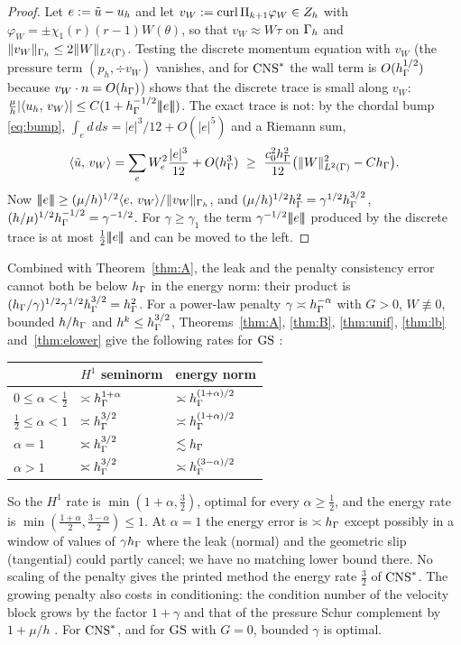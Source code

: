 \begin{proof}
Let $e:=\tilde u-u_h$ and let $v_W:=\operatorname{curl}\Pi_{k+1}\varphi_W\in Z_h$ with $\varphi_W=\pm\chi_1(r)(r-1)W(\theta)$, so that $v_W\approx W\tau$ on $\Gamma_h$ and $\lVert v_W\rVert_{\Gamma_h}\le2\lVert W\rVert_{L^2(\Gamma)}$. Testing the discrete momentum equation with $v_W$ (the pressure term $(p_h,\div v_W)$ vanishes, and for $\mathrm{CNS}^\ast$ the wall term is $O(h_\Gamma^{1/2})$ because $v_W\cdot n=O(h_\Gamma)$) shows that the discrete trace is small along $v_W$: $\frac\mu h|\langle u_h,\, v_W\rangle|\le C(1+h_\Gamma^{-1/2}|\!|\!|e|\!|\!|)$. The exact trace is not: by the chordal bump \eqref{eq:bump}, $\int_ed\,ds=|e|^3/12+O(|e|^5)$ and a Riemann sum,
\[
\ip{\ut}{v_W}=\sum_eW_e^2\frac{|e|^3}{12}+O(\hG^3)\ \ge\ \frac{c_0^2\hG^2}{12}\bigl(\norm W^2_{L^2(\Gamma)}-C\hG\bigr).
\]
Now $|\!|\!|e|\!|\!|\ge(\mu/h)^{1/2}\langle e,\, v_W\rangle/\lVert v_W\rVert_{\Gamma_h}$, and $(\mu/h)^{1/2}h_\Gamma^2=\gamma^{1/2}h_\Gamma^{3/2}$, $(h/\mu)^{1/2}h_\Gamma^{-1/2}=\gamma^{-1/2}$. For $\gamma\ge\gamma_1$ the term $\gamma^{-1/2}|\!|\!|e|\!|\!|$ produced by the discrete trace is at most $\frac12|\!|\!|e|\!|\!|$ and can be moved to the left.
\end{proof}
Combined with Theorem~\ref{thm:A}, the leak and the penalty consistency error cannot both be below $h_\Gamma$ in the energy norm: their product is $(h_\Gamma/\gamma)^{1/2}\gamma^{1/2}h_\Gamma^{3/2}=h_\Gamma^2$. For a power-law penalty $\gamma\asymp h_\Gamma^{-\alpha}$ with $G>0$, $W\not\equiv0$, bounded $h/h_\Gamma$ and $h^k\le h_\Gamma^{3/2}$, Theorems~\ref{thm:A}, \ref{thm:B}, \ref{thm:unif}, \ref{thm:lb} and~\ref{thm:elower} give the following rates for $\mathrm{GS}$ \cite{PadhiExt}:
\begin{center}\small
\begin{tabular}{lll}
\toprule
& $H^1$ seminorm & energy norm\\
\midrule
$0\le\alpha<\frac12$ & $\asymp h_\Gamma^{1+\alpha}$ & $\asymp h_\Gamma^{(1+\alpha)/2}$\\
$\frac12\le\alpha<1$ & $\asymp h_\Gamma^{3/2}$ & $\asymp h_\Gamma^{(1+\alpha)/2}$\\
$\alpha=1$ & $\asymp h_\Gamma^{3/2}$ & $\lesssim h_\Gamma$\\
$\alpha>1$ & $\asymp h_\Gamma^{3/2}$ & $\asymp h_\Gamma^{(3-\alpha)/2}$\\
\bottomrule
\end{tabular}
\end{center}
So the $H^1$ rate is $\min(1+\alpha,\frac32)$, optimal for every $\alpha\ge\frac12$, and the energy rate is $\min(\frac{1+\alpha}2,\frac{3-\alpha}2)\le1$. At $\alpha=1$ the energy error is $\asymp h_\Gamma$ except possibly in a window of values of $\gamma h_\Gamma$ where the leak (normal) and the geometric slip (tangential) could partly cancel; we have no matching lower bound there. No scaling of the penalty gives the printed method the energy rate $\frac32$ of $\mathrm{CNS}^\ast$. The growing penalty also costs in conditioning: the condition number of the velocity block grows by the factor $1+\gamma$ and that of the pressure Schur complement by $1+\mu/h$ \cite{PadhiExt}. For $\mathrm{CNS}^\ast$, and for $\mathrm{GS}$ with $G=0$, bounded $\gamma$ is optimal.
